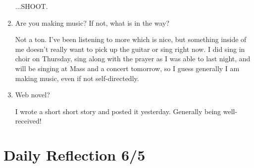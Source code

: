 \documentclass[12pt]{article}
\renewcommand{\,}{\textsuperscript{,}}
\begin{document}
\begin{enumerate}
...SHOOT.

\item Are you making music? If not, what is in the way?

Not a ton. I've been listening to more which is nice, but something inside of me doesn't really want to pick up the guitar or sing right now.  
I did sing in choir on Thursday, sing along with the prayer as I was able to last night, and will be singing at Mass and a concert tomorrow, so I guess generally I am making music, even if not self-directedly.

\item Web novel?

I wrote a short short story and posted it yesterday.  
Generally being well-received!

\end{enumerate}

\section{Daily Reflection 6/5}
\end{document}
